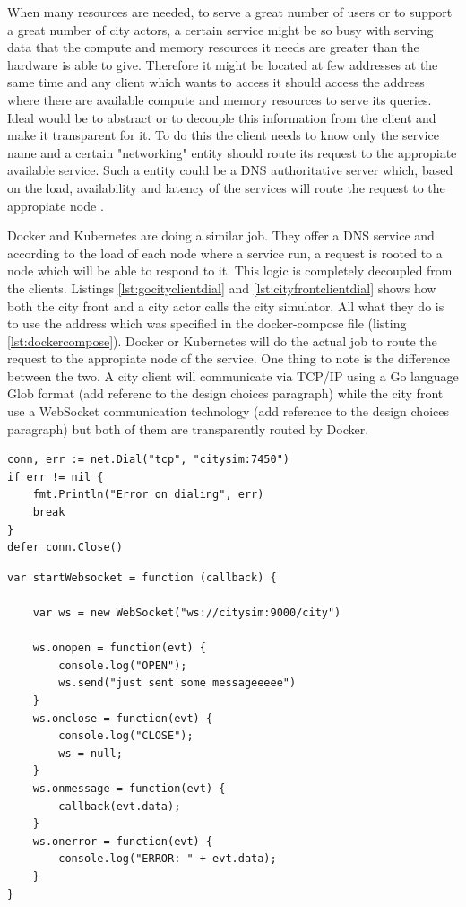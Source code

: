 \documentclass[conference]{IEEEtran}
\begin{document}
When many resources are needed, to serve a great number of users or to support a great number of city actors, a certain service might be so busy with serving data that the compute and memory resources it needs are greater than the hardware is able to give. Therefore it might be located at few addresses at the same time and any client which wants to access it should access the address where there are available compute and memory resources to serve its queries. Ideal would be to abstract or to decouple this information from the client and make it transparent for it. To do this the client needs to know only the service name and a certain "networking" entity should route its request to the appropiate available service. Such a entity could be a DNS authoritative server which, based on the load, availability and latency of the services will route the request to the appropiate node \citep{swildens2006scalable}.

Docker and Kubernetes are doing a similar job. They offer a DNS service and according to the load of each node where a service run, a request is rooted to a node which will be able to respond to it. This logic is completely decoupled from the clients. Listings \ref{lst:gocityclientdial} and \ref{lst:cityfrontclientdial} shows how both the city front and a city actor calls the city simulator. All what they do is to use the address which was specified in the docker-compose file (listing \ref{lst:dockercompose}). Docker or Kubernetes will do the actual job to route the request to the appropiate node of the service. One thing to note is the difference between the two. A city client will communicate via TCP/IP using a Go language Glob format (add referenc to the design choices paragraph) while the city front use a WebSocket communication technology (add reference to the design choices paragraph) but both of them are transparently routed by Docker.

\begin{lstlisting}[caption=City actor dialing City simulator, label=lst:gocityclientdial]
conn, err := net.Dial("tcp", "citysim:7450")
if err != nil {
    fmt.Println("Error on dialing", err)
    break
}
defer conn.Close()
\end{lstlisting}

\begin{lstlisting}[caption=City front dialing City simulator, label=lst:cityfrontclientdial]
var startWebsocket = function (callback) {

    var ws = new WebSocket("ws://citysim:9000/city")

    ws.onopen = function(evt) {
        console.log("OPEN");
        ws.send("just sent some messageeeee")
    }
    ws.onclose = function(evt) {
        console.log("CLOSE");
        ws = null;
    }
    ws.onmessage = function(evt) {
        callback(evt.data);
    }
    ws.onerror = function(evt) {
        console.log("ERROR: " + evt.data);
    }
}
\end{lstlisting}
\end{document}
